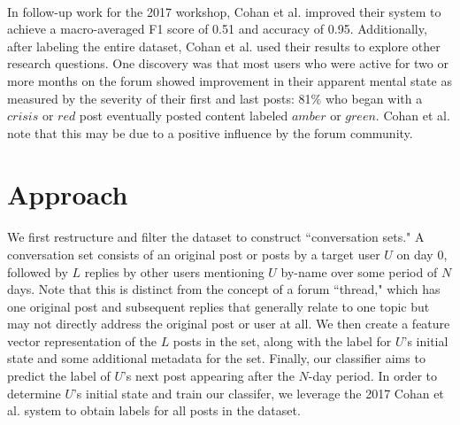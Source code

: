 \documentclass{article}
\begin{document}
\paragraph{}In follow-up work for the 2017 workshop, Cohan et al. improved their system to achieve a macro-averaged F1 score of 0.51 and accuracy of 0.95. Additionally, after labeling the entire dataset, Cohan et al. used their results to explore other research questions. One discovery was that most users who were active for two or more months on the forum showed improvement in their apparent mental state as measured by the severity of their first and last posts: 81\% who began with a $crisis$ or $red$ post eventually posted content labeled $amber$ or $green$\cite{cohan2}. Cohan et al. note that this may be due to a positive influence by the forum community.

\section{Approach}

\paragraph{}We first restructure and filter the dataset to construct ``conversation sets." A conversation set consists of an original post or posts by a target user $U$ on day 0, followed by $L$ replies by other users mentioning $U$ by-name over some period of $N$ days. Note that this is distinct from the concept of a forum ``thread," which has one original post and subsequent replies that generally relate to one topic but may not directly address the original post or user at all. We then create a feature vector representation of the $L$ posts in the set, along with the label for $U$'s initial state and some additional metadata for the set. Finally, our classifier aims to predict the label of $U$'s next post appearing after the $N$-day period. In order to determine $U$'s initial state and train our classifer, we leverage the 2017 Cohan et al. system to obtain labels for all posts in the dataset.
\end{document}
